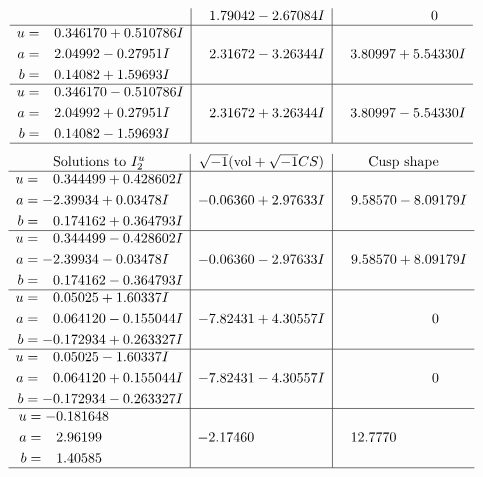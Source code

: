 \documentclass[1p]{elsarticle_modified}
\theoremstyle{definition}
\newcommand{\I}{\sqrt{-1}}
\begin{document}
$$\begin{array}{c|c|c}
 & \phantom{-}1.79042 - 2.67084 I & \phantom{-0.000000 } 0 \\ \hline\begin{aligned}
u &= \phantom{-}0.346170 + 0.510786 I \\
a &= \phantom{-}2.04992 - 0.27951 I \\
b &= \phantom{-}0.14082 + 1.59693 I\end{aligned}
 & \phantom{-}2.31672 - 3.26344 I & \phantom{-}3.80997 + 5.54330 I \\ \hline\begin{aligned}
u &= \phantom{-}0.346170 - 0.510786 I \\
a &= \phantom{-}2.04992 + 0.27951 I \\
b &= \phantom{-}0.14082 - 1.59693 I\end{aligned}
 & \phantom{-}2.31672 + 3.26344 I & \phantom{-}3.80997 - 5.54330 I\\
 \hline 
 \end{array}$$\newpage$$\begin{array}{c|c|c}  
\text{Solutions to }I^u_{2}& \I (\text{vol} + \sqrt{-1}CS) & \text{Cusp shape}\\
 \hline 
\begin{aligned}
u &= \phantom{-}0.344499 + 0.428602 I \\
a &= -2.39934 + 0.03478 I \\
b &= \phantom{-}0.174162 + 0.364793 I\end{aligned}
 & -0.06360 + 2.97633 I & \phantom{-}9.58570 - 8.09179 I \\ \hline\begin{aligned}
u &= \phantom{-}0.344499 - 0.428602 I \\
a &= -2.39934 - 0.03478 I \\
b &= \phantom{-}0.174162 - 0.364793 I\end{aligned}
 & -0.06360 - 2.97633 I & \phantom{-}9.58570 + 8.09179 I \\ \hline\begin{aligned}
u &= \phantom{-}0.05025 + 1.60337 I \\
a &= \phantom{-}0.064120 - 0.155044 I \\
b &= -0.172934 + 0.263327 I\end{aligned}
 & -7.82431 + 4.30557 I & \phantom{-0.000000 } 0 \\ \hline\begin{aligned}
u &= \phantom{-}0.05025 - 1.60337 I \\
a &= \phantom{-}0.064120 + 0.155044 I \\
b &= -0.172934 - 0.263327 I\end{aligned}
 & -7.82431 - 4.30557 I & \phantom{-0.000000 } 0 \\ \hline\begin{aligned}
u &= -0.181648\phantom{ +0.000000I} \\
a &= \phantom{-}2.96199\phantom{ +0.000000I} \\
b &= \phantom{-}1.40585\phantom{ +0.000000I}\end{aligned}
 & -2.17460\phantom{ +0.000000I} & \phantom{-}12.7770\phantom{ +0.000000I}\\
 \hline 
 \end{array}$$\newpage
\end{document}
